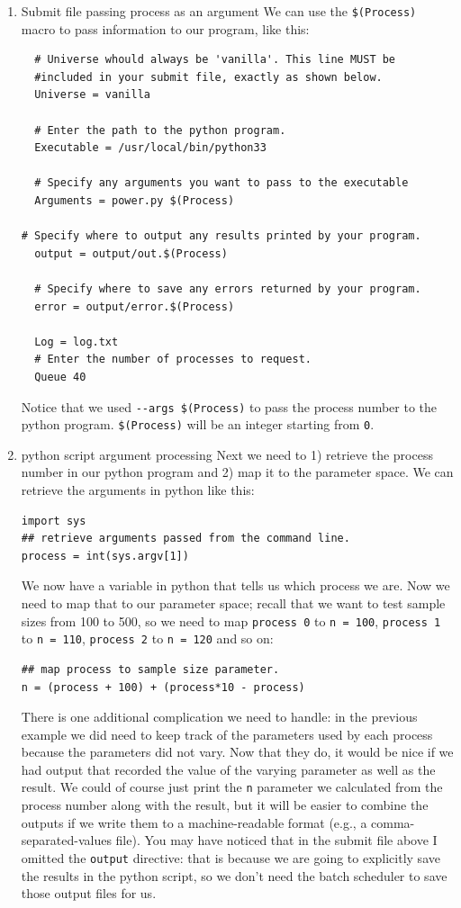 \documentclass[11pt]{article}
\begin{document}
\begin{enumerate}
\item Submit file passing process as an argument
\label{sec:org6fbe088}
We can use the \texttt{\$(Process)} macro to pass information to our program, like this:
\begin{verbatim}
  # Universe whould always be 'vanilla'. This line MUST be 
  #included in your submit file, exactly as shown below.
  Universe = vanilla

  # Enter the path to the python program.
  Executable = /usr/local/bin/python33

  # Specify any arguments you want to pass to the executable
  Arguments = power.py $(Process)

# Specify where to output any results printed by your program.
  output = output/out.$(Process)

  # Specify where to save any errors returned by your program.
  error = output/error.$(Process)

  Log = log.txt
  # Enter the number of processes to request.
  Queue 40
\end{verbatim}

Notice that we used \texttt{-{}-args \$(Process)} to pass the process number to the python program. \texttt{\$(Process)} will be an integer starting from \texttt{0}. 

\item python script argument processing
\label{sec:orgc4e23d0}
Next we need to 1) retrieve the process number in our python program and 2) map it to the parameter space. We can retrieve the arguments in python like this:
\begin{verbatim}
import sys
## retrieve arguments passed from the command line.
process = int(sys.argv[1])
\end{verbatim}
We now have a variable in python that tells us which process we are. Now we need to map that to our parameter space; recall that we want to test sample sizes from 100 to 500, so we need to map \texttt{process 0} to \texttt{n = 100},  \texttt{process 1} to \texttt{n = 110}, \texttt{process 2} to \texttt{n = 120} and so on:
\begin{verbatim}
## map process to sample size parameter.
n = (process + 100) + (process*10 - process)
\end{verbatim}

There is one additional complication we need to handle: in the previous example we did need to keep track of the parameters used by each process because the parameters did not vary. Now that they do, it would be nice if we had output that recorded the value of the varying parameter as well as the result. We could of course just print the \texttt{n} parameter we calculated from the process number along with the result, but it will be easier to combine the outputs if we write them to a machine-readable format (e.g., a comma-separated-values file). You may have noticed that in the submit file above I omitted the \texttt{output} directive: that is because we are going to explicitly save the results in the python script, so we don't need the batch scheduler to save those output files for us.


\end{enumerate}
\end{document}
